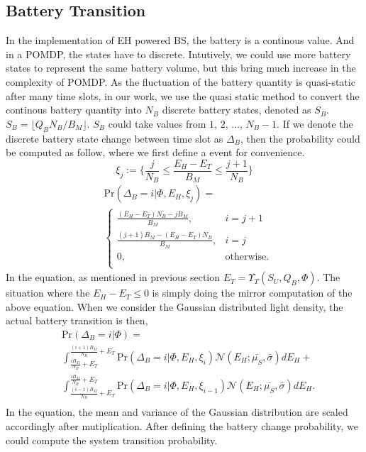 \documentclass[conference]{IEEEtran}
\begin{document}
\subsection{Battery Transition}
In the implementation of EH powered BS, the battery is a continous value. 
And in a POMDP, the states have to discrete. 
Intutively, we could use more battery states to represent the same battery volume, 
but this bring much increase in the complexity of POMDP.
As the fluctuation of the battery quantity is quasi-static after many time slots,
in our work, we use the quasi static method \cite{} to convert 
the continous battery quantity into \(N_B\) discrete battery states,
denoted as \(S_B\). \(S_B = \lfloor Q_B N_B / B_M \rfloor\). \(S_B\) could take values from \(1,\,2,\,...,\,N_B - 1\).
If we denote the discrete battery state change between time slot as \(\Delta_B\), 
then the probability could be computed as follow, where we first define a event for convenience. 
\begin{equation}
	\xi_j := \Big\{\frac{j}{N_B}\leq\frac{E_H - E_T}{B_M} \leq \frac{j+1}{N_B}\Big\}
\end{equation}
\begin{align}&\mbox{Pr}\left(\Delta_B = i |\Phi, E_H, \xi_j \right)=\nonumber\\
&\begin{cases} \frac{\left(E_H - E_T\right)N_B - jB_M}{B_M}, &\mbox{$i = j + 1$}\\
\frac{\left(j+1\right)B_M -\left(E_H - E_T\right)N_B} {B_M}, &\mbox{$i = j$}\\
0, &\mbox{otherwise.}\\
\end{cases}
\end{align}
In the equation, as mentioned in previous section \(E_T = \Upsilon_T(S_U, Q_B, \Phi)\).
The situation where the \(E_H - E_T \le 0\) is simply doing the mirror computation of the above equation.
When we consider the Gaussian distributed light density, the actual battery transition is then,
\begin{equation}\label{battery}
\begin{aligned}
	&\mbox{Pr}\left(\Delta_B = i |\Phi\right) = \\
	&\int_{\frac{iB_M}{N_B} + E_T}^{\frac{\left(i+1\right)B_M}{N_B} + E_T}
	\mbox{Pr}\left(\Delta_B = i |\Phi, E_H, \xi_i\right) \mathcal{N}\left(E_H;\bar{\mu_S},\bar{\sigma}\right) dE_H+\\
	& \int_{\frac{\left(i-1\right)B_M}{N_B} + E_T}^{\frac{iB_M}{N_B} + E_T} 
	\mbox{Pr}\left(\Delta_B = i |\Phi, E_H, \xi_{i-1}\right) \mathcal{N}\left(E_H;\bar{\mu_S},\bar{\sigma}\right) dE_H.\\
\end{aligned}
\end{equation}
In the equation, the mean and variance of the Gaussian distribution are scaled accordingly after mutiplication.
After defining the battery change probability, we could compute the system transition probability.
\end{document}
